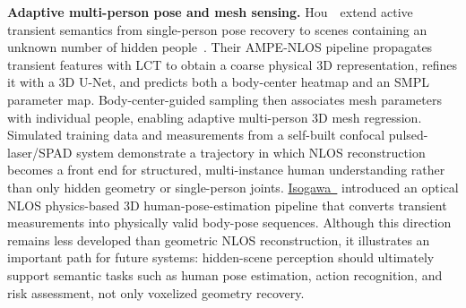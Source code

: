\vspace{0.8mm}
\noindent \textbf{Adaptive multi-person pose and mesh sensing.}
Hou~\etal~extend active transient semantics from single-person pose recovery to scenes containing an unknown number of hidden people~\cite{houMultiPersonPose2025}. Their AMPE-NLOS pipeline propagates transient features with LCT to obtain a coarse physical 3D representation, refines it with a 3D U-Net, and predicts both a body-center heatmap and an SMPL parameter map. Body-center-guided sampling then associates mesh parameters with individual people, enabling adaptive multi-person 3D mesh regression. Simulated training data and measurements from a self-built confocal pulsed-laser/SPAD system demonstrate a trajectory in which NLOS reconstruction becomes a front end for structured, multi-instance human understanding rather than only hidden geometry or single-person joints.
 \href{https://arxiv.org/abs/2003.14414}{Isogawa~\etal} introduced an optical NLOS physics-based 3D human-pose-estimation pipeline that converts transient measurements into physically valid body-pose sequences. Although this direction remains less developed than geometric NLOS reconstruction, it illustrates an important path for future systems: hidden-scene perception should ultimately support semantic tasks such as human pose estimation, action recognition, and risk assessment, not only voxelized geometry recovery.